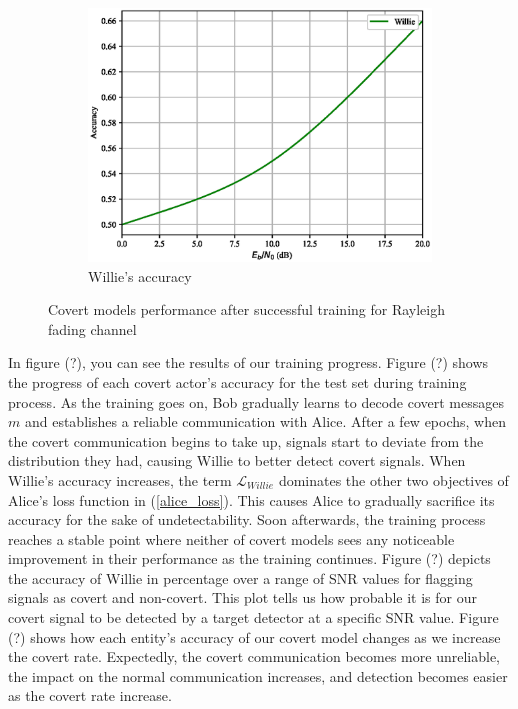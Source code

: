 \begin{figure}[th!]
\begin{subfigure}{0.3\textwidth}
		\includegraphics[width=\linewidth]{figs/willie_accuracy_rayleigh}
		\caption{Willie's accuracy}	
	\end{subfigure}
	\caption{Covert models performance after successful training for Rayleigh fading channel}%
\end{figure}
In figure (?), you can see the results of our training progress. Figure (?) shows the progress of each covert actor's accuracy for the test set during training process. As the training goes on, Bob gradually learns to decode covert messages \(m\) and establishes a reliable communication with Alice. After a few epochs, when the covert communication begins to take up, signals start to deviate from the distribution they had, causing Willie to better detect covert signals. When Willie's accuracy increases, the term \(\mathcal{L}_{Willie}\) dominates the other two objectives of Alice's loss function in (\ref{alice_loss}). This causes Alice to gradually sacrifice its accuracy for the sake of undetectability. Soon afterwards, the training process reaches a stable point where neither of covert models sees any noticeable improvement in their performance as the training continues. Figure (?) depicts the accuracy of Willie in percentage over a range of SNR values for flagging signals as covert and non-covert. This plot tells us how probable it is for our covert signal to be detected by a target detector at a specific SNR value. Figure (?) shows how each entity's accuracy of our covert model changes as we increase the covert rate. Expectedly, the covert communication becomes more unreliable, the impact on the normal communication increases, and detection becomes easier as the covert rate increase.\\
